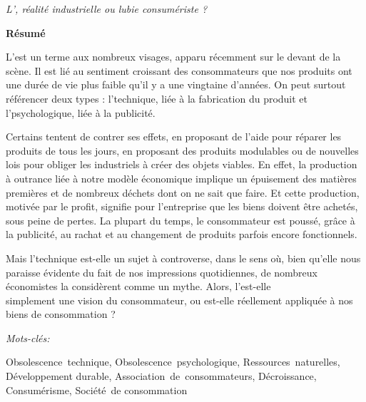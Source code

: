 \pagestyle{empty}

\begin{center}
\begin{LARGE}
\textit{L'\OP, réalité industrielle ou lubie consumériste ? }
\end{LARGE}
\end{center}


\begin{thmbox}[L]{\begin{Large}\textbf{Résumé}\end{Large}}
\vspace{0.25\baselineskip}
L'\op est un terme aux nombreux visages, apparu récemment sur le devant de la scène. Il est lié au sentiment croissant des consommateurs que nos produits ont une durée de vie plus faible qu'il y a une vingtaine d'années. 
On peut surtout référencer deux types : l'\op technique, liée à la fabrication du produit et l'\op psychologique, liée à la publicité.

Certains tentent de contrer ses effets, en proposant de l'aide pour réparer les produits de tous les jours, en proposant des produits modulables ou de nouvelles lois pour obliger les industriels à créer des objets viables. 
En effet, la production à outrance liée à notre modèle économique implique un épuisement des matières premières et de nombreux déchets dont on ne sait que faire. Et cette production, motivée par le profit, signifie pour l'entreprise que les biens doivent être achetés, sous peine de pertes. La plupart du temps, le consommateur est poussé, grâce à la publicité, au rachat et au changement de produits parfois encore fonctionnels. 

Mais l'\op technique est-elle un sujet à controverse, dans le sens où, bien qu'elle nous paraisse évidente du fait de nos impressions quotidiennes, de nombreux économistes la considèrent comme un mythe. Alors, l'\op est-elle \\simplement une vision du consommateur, ou est-elle réellement appliquée à nos biens de consommation ?
\end{thmbox}
\vspace{0.5\baselineskip}

\begin{large}\emph{Mots-clés:} \end{large}
\vspace{0.25\baselineskip}\noindent
Obsolescence~technique, Obsolescence~psychologique, Ressources~naturelles, Développement durable, Association~de~consommateurs, Décroissance, Consumérisme, Société~de consommation

